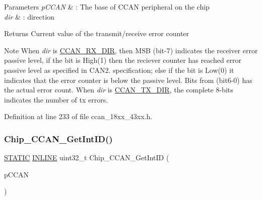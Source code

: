 \begin{DoxyParams}{Parameters}
{\em p\+C\+C\+AN} & \+: The base of C\+C\+AN peripheral on the chip \\
\hline
{\em dir} & \+: direction \\
\hline
\end{DoxyParams}
\begin{DoxyReturn}{Returns}
Current value of the transmit/receive error counter 
\end{DoxyReturn}
\begin{DoxyNote}{Note}
When {\itshape dir} is \hyperlink{group___c_c_a_n__18_x_x__43_x_x_ggac400be6c4ae22b8b773b0bea6e9c5f02a20cb141be8468d07983601deedd9f726}{C\+C\+A\+N\+\_\+\+R\+X\+\_\+\+D\+IR}, then M\+SB (bit-\/7) indicates the receiver error passive level, if the bit is High(1) then the reciever counter has reached error passive level as specified in C\+A\+N2. specification; else if the bit is Low(0) it indicates that the error counter is below the passive level. Bits from (bit6-\/0) has the actual error count. When {\itshape dir} is \hyperlink{group___c_c_a_n__18_x_x__43_x_x_ggac400be6c4ae22b8b773b0bea6e9c5f02a03c25f707e2e0857392c2def9e8cef20}{C\+C\+A\+N\+\_\+\+T\+X\+\_\+\+D\+IR}, the complete 8-\/bits indicates the number of tx errors. 
\end{DoxyNote}


Definition at line 233 of file ccan\+\_\+18xx\+\_\+43xx.\+h.

\mbox{\label{group___c_c_a_n__18_x_x__43_x_x_ga0f994d17cbfb6859384c4f4896a23156}} 
\subsubsection{\texorpdfstring{Chip\+\_\+\+C\+C\+A\+N\+\_\+\+Get\+Int\+I\+D()}{Chip\_CCAN\_GetIntID()}}
{\footnotesize\ttfamily \hyperlink{group___l_p_c___types___public___macros_ga10b2d890d871e1489bb02b7e70d9bdfb}{S\+T\+A\+T\+IC} \hyperlink{spifi__18xx__43xx_8h_a2eb6f9e0395b47b8d5e3eeae4fe0c116}{I\+N\+L\+I\+NE} uint32\+\_\+t Chip\+\_\+\+C\+C\+A\+N\+\_\+\+Get\+Int\+ID (\begin{DoxyParamCaption}\item[{\hyperlink{struct_l_p_c___c_c_a_n___t}{L\+P\+C\+\_\+\+C\+C\+A\+N\+\_\+T} $\ast$}]{p\+C\+C\+AN }\end{DoxyParamCaption})}



